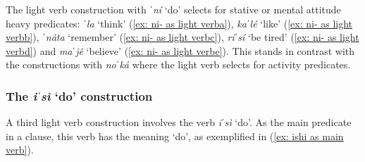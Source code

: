                    \label{ex: ni- as light verbe}
    \z
\z

The light verb construction with \textit{ˈní} `do' selects for stative or mental attitude heavy predicates: \textit{ˈla} `think’ (\ref{ex: ni- as light verba}), \textit{kaˈlé} `like’ (\ref{ex: ni- as light verbb}), \textit{ˈnâta} `remember' (\ref{ex: ni- as light verbc}), \textit{riˈsí} `be tired' (\ref{ex: ni- as light verbd}) and \textit{maˈjê} `believe' (\ref{ex: ni- as light verbe}). This stands in contrast with the constructions with \textit{noˈká} where the light verb selects for activity predicates.

\largerpage
\subsubsection{The \textit{iˈsì} ‘do’ construction}
\label{subsubsec: the iʃi 'do' construction}

A third light verb construction involves the verb \textit{iˈsì} ‘do’. As the main predicate in a clause, this verb has the meaning `do', as exemplified in (\ref{ex: ishi as main verb}).

\ea\label{ex: ishi as main verb}

    \z
\z

